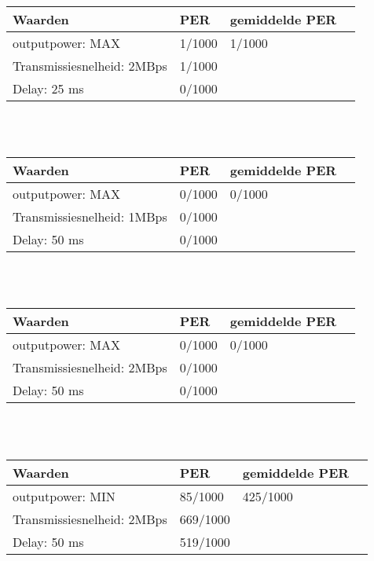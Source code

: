 \documentclass{article}
\begin{document}
    \begin{tabular}{ | l | l | l | p{5cm} |}
    \hline
    Waarden 					& PER 		& gemiddelde PER\\ \hline
    outputpower: MAX 			& 1/1000 	& 1/1000		\\ \hline
    Transmissiesnelheid: 2MBps 	& 1/1000 	& 				\\ \hline
    Delay: 25 ms 				& 0/1000	&  				\\ \hline
    \end{tabular}\\
    \\
    
    \begin{tabular}{ | l | l | l | p{5cm} |}
    \hline
    Waarden 					& PER 		& gemiddelde PER\\ \hline
    outputpower: MAX 			& 0/1000 	& 0/1000		\\ \hline
    Transmissiesnelheid: 1MBps 	& 0/1000 	&  				\\ \hline
    Delay: 50 ms 				& 0/1000	&  				\\ \hline
    \end{tabular}\\
    \\
    
    \begin{tabular}{ | l | l | l | p{5cm} |}
    \hline
    Waarden 					& PER 		& gemiddelde PER\\ \hline
    outputpower: MAX 			& 0/1000 	& 0/1000		\\ \hline
    Transmissiesnelheid: 2MBps 	& 0/1000 	&  				\\ \hline
    Delay: 50 ms 				& 0/1000	&  				\\ \hline
    \end{tabular}\\
    \\
    
    \begin{tabular}{ | l | l | l | p{5cm} |}
    \hline
    Waarden 					& PER 		& gemiddelde PER\\ \hline
    outputpower: MIN 			& 85/1000 	& 425/1000		\\ \hline
    Transmissiesnelheid: 2MBps 	& 669/1000  &  				\\ \hline
    Delay: 50 ms 				& 519/1000 	&  				\\ \hline
    \end{tabular}\\
    \\
    
\end{document}
